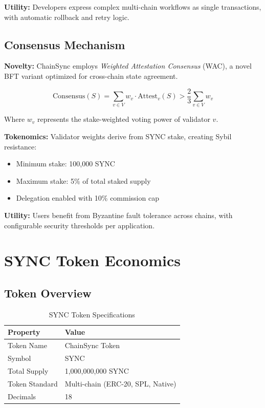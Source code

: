 \documentclass[12pt,a4paper]{article}
\begin{document}
\textbf{Utility:} Developers express complex multi-chain workflows as single transactions, with automatic rollback and retry logic.

\subsection{Consensus Mechanism}

\textbf{Novelty:} ChainSync employs \textit{Weighted Attestation Consensus} (WAC), a novel BFT variant optimized for cross-chain state agreement.

\begin{equation}
\text{Consensus}(S) = \sum_{v \in V} w_v \cdot \text{Attest}_v(S) > \frac{2}{3} \sum_{v \in V} w_v
\end{equation}

Where $w_v$ represents the stake-weighted voting power of validator $v$.

\textbf{Tokenomics:} Validator weights derive from SYNC stake, creating Sybil resistance:
\begin{itemize}
    \item Minimum stake: 100,000 SYNC
    \item Maximum stake: 5\% of total staked supply
    \item Delegation enabled with 10\% commission cap
\end{itemize}

\textbf{Utility:} Users benefit from Byzantine fault tolerance across chains, with configurable security thresholds per application.

\section{SYNC Token Economics}

\subsection{Token Overview}

\begin{table}[h]
\centering
\begin{tabular}{ll}
\toprule
\textbf{Property} & \textbf{Value} \\
\midrule
Token Name & ChainSync Token \\
Symbol & SYNC \\
Total Supply & 1,000,000,000 SYNC \\
Token Standard & Multi-chain (ERC-20, SPL, Native) \\
Decimals & 18 \\
\bottomrule
\end{tabular}
\caption{SYNC Token Specifications}
\end{table}
\end{document}

